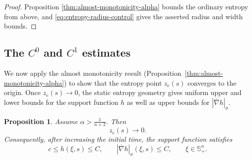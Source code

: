 \documentclass[11pt, reqno]{amsart}
\newtheorem{proposition}[theorem]{Proposition}
\theoremstyle{remark}
\theoremstyle{definition}
\numberwithin{equation}{section}
\begin{document}
\begin{proof}
Proposition \ref{thm:almost-monotonicity-alpha} bounds the ordinary entropy from above, and \eqref{eq:entropy-radius-control} gives the asserted radius and width bounds.
\end{proof}

\subsection{The $C^0$ and $C^1$ estimates}
We now apply the almost monotonicity result (Proposition~\ref{thm:almost-monotonicity-alpha}) to show that the entropy point $z_e(s)$ converges to the origin. Once $z_e(s)\to0$, the static entropy geometry gives uniform upper and lower bounds for the support function $h$ as well as upper bounds for $|\overline{\nabla}h|_{\sigma}$.

\begin{proposition}
	\label{thm:C0-alpha}
	Assume $\alpha>\frac{1}{n+2}$. Then
	\begin{equation}
    \label{eq:entropy-point-to-zero}
		z_e(s)\longrightarrow 0.
	\end{equation}
	Consequently, after increasing the initial time, the support function satisfies
	\begin{equation}\label{eq:subunit-origin-C0}
		c\le h(\xi,s)\le C,\qquad |\overline{\nabla}h|_{\sigma}(\xi,s)\leq C,
		\qquad \xi\in\mathbb{S}^n_+.
	\end{equation}
\end{proposition}
\end{document}
